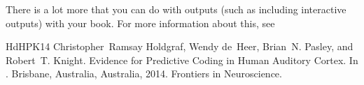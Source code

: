 \documentclass[letterpaper,10pt,english]{sphinxmanual}
\begin{document}
\noindent{}

There is a lot more that you can do with outputs (such as including interactive outputs)
with your book. For more information about this, see 

\begin{sphinxthebibliography}{HdHPK14}
Christopher Ramsay Holdgraf, Wendy de Heer, Brian N. Pasley, and Robert T. Knight. Evidence for Predictive Coding in Human Auditory Cortex. In . Brisbane, Australia, Australia, 2014. Frontiers in Neuroscience.
\end{sphinxthebibliography}







\renewcommand{\indexname}{Index}
\printindex
\end{document}
